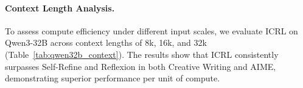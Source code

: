 \documentclass{article} %
\newcommand{\0}{\mathbf{0}}
\begin{document}


\paragraph{Context Length Analysis.}
To assess compute efficiency under different input scales, we evaluate ICRL on Qwen3-32B \citep{yang2025qwen3technicalreport} across context lengths of 8k, 16k, and 32k (Table~\ref{tab:qwen32b_context}). The results show that ICRL consistently surpasses Self-Refine and Reflexion in both Creative Writing and AIME, demonstrating superior performance per unit of compute. 



\end{document}
